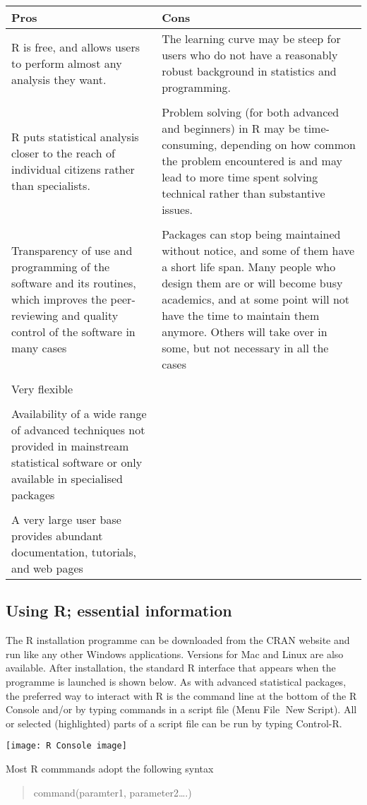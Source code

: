 \documentclass[
]{article}
\begin{document}
\begin{longtable}[]{@{}
  >{\raggedright\arraybackslash}p{}
  >{\raggedleft\arraybackslash}p{}@{}}
\toprule
Pros & Cons \\
\midrule
\endhead
R is free, and allows users to perform almost any analysis they want. &
The learning curve may be steep for users who do not have a reasonably
robust background in statistics and programming. \\
& \\
R puts statistical analysis closer to the reach of individual citizens
rather than specialists. & Problem solving (for both advanced and
beginners) in R may be time-consuming, depending on how common the
problem encountered is and may lead to more time spent solving technical
rather than substantive issues. \\
& \\
Transparency of use and programming of the software and its routines,
which improves the peer-reviewing and quality control of the software in
many cases & Packages can stop being maintained without notice, and some
of them have a short life span. Many people who design them are or will
become busy academics, and at some point will not have the time to
maintain them anymore. Others will take over in some, but not necessary
in all the cases \\
& \\
Very flexible & \\
& \\
Availability of a wide range of advanced techniques not provided in
mainstream statistical software or only available in specialised
packages & \\
& \\
A very large user base provides abundant documentation, tutorials, and
web pages & \\
\bottomrule
\end{longtable}

\hypertarget{using-r-essential-information}{%
\subsection{Using R; essential
information}\label{using-r-essential-information}}

The R installation programme can be downloaded from the CRAN website and
run like any other Windows applications. Versions for Mac and Linux are
also available. After installation, the standard R interface that
appears when the programme is launched is shown below. As with advanced
statistical packages, the preferred way to interact with R is the
command line at the bottom of the R Console and/or by typing commands in
a script file (Menu File New Script). All or selected (highlighted)
parts of a script file can be run by typing Control-R.

\texttt{[image: R Console image]}

Most R commmands adopt the following syntax

\begin{quote}
command(paramter1, parameter2\ldots.)
\end{quote}
\end{document}
